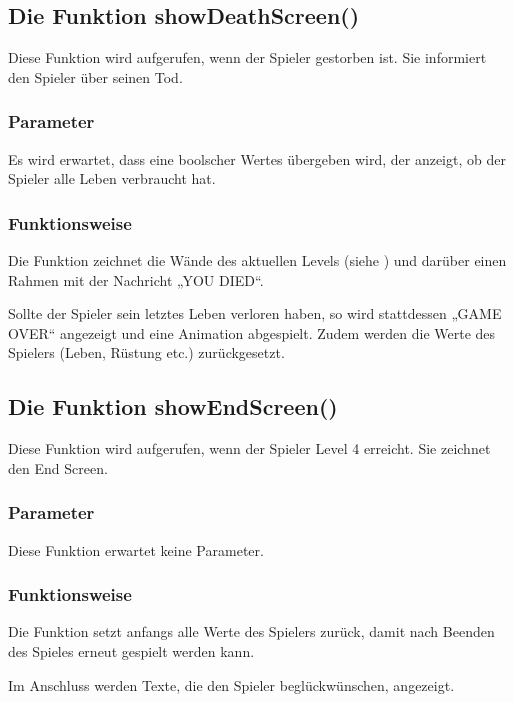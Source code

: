 \documentclass[letterpaper,10pt,ngerman]{sphinxmanual}
\begin{document}
\subsection{Die Funktion showDeathScreen()}
\label{\detokenize{programming:die-funktion-showdeathscreen}}
Diese Funktion wird aufgerufen, wenn der Spieler gestorben ist. Sie
informiert den Spieler über seinen Tod.


\subsubsection{Parameter}
\label{\detokenize{programming:id9}}
Es wird erwartet, dass eine boolscher Wertes übergeben wird, der anzeigt,
ob der Spieler alle Leben verbraucht hat.


\subsubsection{Funktionsweise}
\label{\detokenize{programming:id10}}
Die Funktion zeichnet die Wände des aktuellen Levels (siehe ) und
darüber einen Rahmen mit der Nachricht „YOU DIED“.

Sollte der Spieler sein letztes Leben verloren haben, so wird stattdessen
„GAME OVER“ angezeigt und eine Animation abgespielt. Zudem werden die Werte des
Spielers (Leben, Rüstung etc.) zurückgesetzt.


\subsection{Die Funktion showEndScreen()}
\label{\detokenize{programming:die-funktion-showendscreen}}
Diese Funktion wird aufgerufen, wenn der Spieler Level 4 erreicht. Sie zeichnet
den End Screen.


\subsubsection{Parameter}
\label{\detokenize{programming:id11}}
Diese Funktion erwartet keine Parameter.


\subsubsection{Funktionsweise}
\label{\detokenize{programming:id12}}
Die Funktion setzt anfangs alle Werte des Spielers zurück, damit nach Beenden
des Spieles erneut gespielt werden kann.

Im Anschluss werden Texte, die den Spieler beglückwünschen, angezeigt.
\end{document}
